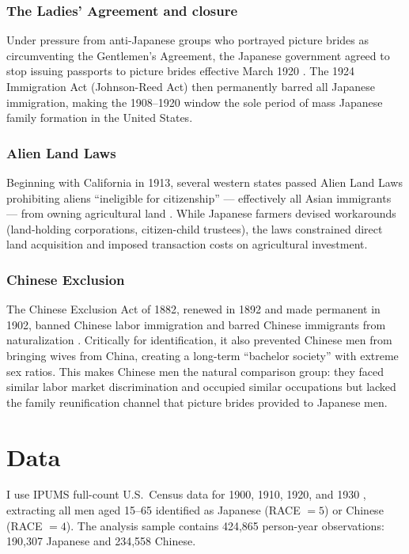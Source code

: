 \documentclass[12pt]{article}
\begin{document}
\subsubsection*{The Ladies' Agreement and closure}  Under pressure from anti-Japanese groups who portrayed picture brides as circumventing the Gentlemen's Agreement, the Japanese government agreed to stop issuing passports to picture brides effective March 1920 \citep{ichioka1988issei}. The 1924 Immigration Act (Johnson-Reed Act) then permanently barred all Japanese immigration, making the 1908--1920 window the sole period of mass Japanese family formation in the United States.

\subsubsection*{Alien Land Laws}  Beginning with California in 1913, several western states passed Alien Land Laws prohibiting aliens ``ineligible for citizenship'' --- effectively all Asian immigrants --- from owning agricultural land \citep{almaguer1994racial, arai2020alien}. While Japanese farmers devised workarounds (land-holding corporations, citizen-child trustees), the laws constrained direct land acquisition and imposed transaction costs on agricultural investment.

\subsubsection*{Chinese Exclusion}  The Chinese Exclusion Act of 1882, renewed in 1892 and made permanent in 1902, banned Chinese labor immigration and barred Chinese immigrants from naturalization \citep{lee2003immigration, ngai2004impossible}. Critically for identification, it also prevented Chinese men from bringing wives from China, creating a long-term ``bachelor society'' with extreme sex ratios. This makes Chinese men the natural comparison group: they faced similar labor market discrimination and occupied similar occupations but lacked the family reunification channel that picture brides provided to Japanese men.

\section{Data}

I use IPUMS full-count U.S.\ Census data for 1900, 1910, 1920, and 1930 \citep{ruggles2024ipums}, extracting all men aged 15--65 identified as Japanese (RACE $= 5$) or Chinese (RACE $= 4$). The analysis sample contains 424,865 person-year observations: 190,307 Japanese and 234,558 Chinese.
\end{document}

